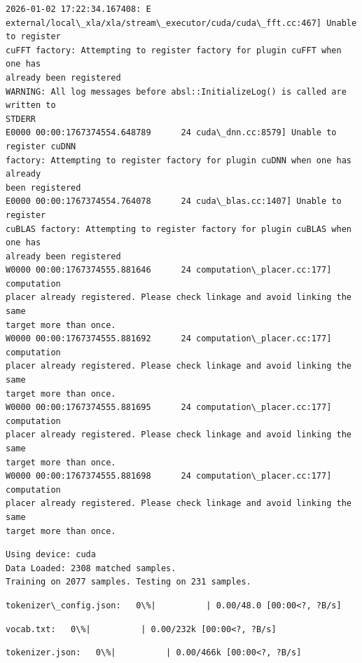 \documentclass[11pt]{article}
\begin{document}
    \begin{Verbatim}[commandchars=\\\{\}]
2026-01-02 17:22:34.167408: E
external/local\_xla/xla/stream\_executor/cuda/cuda\_fft.cc:467] Unable to register
cuFFT factory: Attempting to register factory for plugin cuFFT when one has
already been registered
WARNING: All log messages before absl::InitializeLog() is called are written to
STDERR
E0000 00:00:1767374554.648789      24 cuda\_dnn.cc:8579] Unable to register cuDNN
factory: Attempting to register factory for plugin cuDNN when one has already
been registered
E0000 00:00:1767374554.764078      24 cuda\_blas.cc:1407] Unable to register
cuBLAS factory: Attempting to register factory for plugin cuBLAS when one has
already been registered
W0000 00:00:1767374555.881646      24 computation\_placer.cc:177] computation
placer already registered. Please check linkage and avoid linking the same
target more than once.
W0000 00:00:1767374555.881692      24 computation\_placer.cc:177] computation
placer already registered. Please check linkage and avoid linking the same
target more than once.
W0000 00:00:1767374555.881695      24 computation\_placer.cc:177] computation
placer already registered. Please check linkage and avoid linking the same
target more than once.
W0000 00:00:1767374555.881698      24 computation\_placer.cc:177] computation
placer already registered. Please check linkage and avoid linking the same
target more than once.
    \end{Verbatim}

    \begin{Verbatim}[commandchars=\\\{\}]
Using device: cuda
Data Loaded: 2308 matched samples.
Training on 2077 samples. Testing on 231 samples.
    \end{Verbatim}

    
    \begin{Verbatim}[commandchars=\\\{\}]
tokenizer\_config.json:   0\%|          | 0.00/48.0 [00:00<?, ?B/s]
    \end{Verbatim}

    
    
    \begin{Verbatim}[commandchars=\\\{\}]
vocab.txt:   0\%|          | 0.00/232k [00:00<?, ?B/s]
    \end{Verbatim}

    
    
    \begin{Verbatim}[commandchars=\\\{\}]
tokenizer.json:   0\%|          | 0.00/466k [00:00<?, ?B/s]
    \end{Verbatim}
\end{document}
